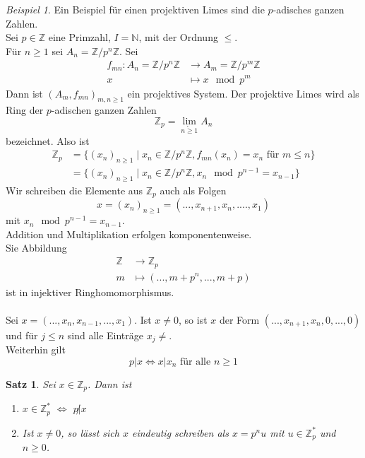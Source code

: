 \documentclass[10pt,a4paper]{article}
\newcommand{\N}{\ensuremath{\mathbb{N}}}
\newcommand{\Z}{\ensuremath{\mathbb{Z}}}
\renewcommand{\projlim}[1]{\lim\limits_{\overleftarrow{#1}}}
\theoremstyle{plain}
\newtheorem{satz}[theorem]{Satz}
\theoremstyle{definition}
\theoremstyle{remark}
\newtheorem{exm}[theorem]{Beispiel}
\begin{document}
	\begin{exm}
		Ein Beispiel für einen projektiven Limes sind die $p$-adisches ganzen Zahlen.\\
		Sei $p\in\Z$ eine Primzahl, $I=\N$, mit der Ordnung $\leq$.\\
		Für $n\geq 1$ sei $A_n=\Z/p^n\Z$. Sei
		\begin{align*}
		f_{mn}:A_n=\Z/p^n\Z&\to A_m=\Z/p^m\Z\\
		x&\mapsto x\mod p^m
		\end{align*}
		Dann ist $(A_m,f_{mn})_{m,n\geq 1}$ ein projektives System. Der projektive Limes wird als Ring der $p$-adischen ganzen Zahlen 
		\[\Z_p=\projlim{n\geq 1}A_n\]
		bezeichnet. Also ist
		\begin{align*}
		\Z_p&=\{(x_n)_{n\geq 1}\mid x_n\in\Z/p^n\Z,f_{mn}(x_n)=x_n\text{ für }m\leq n\}\\
		&=\{(x_n)_{n\geq 1}\mid x_n\in\Z/p^n\Z,x_n\mod p^{n-1}=x_{n-1}\}
		\end{align*}
		Wir schreiben die Elemente aus $\Z_p$ auch als Folgen
		\[x=(x_n)_{n\geq 1}=(...,x_{n+1},x_n,....,x_1)\]
		mit $x_n\mod p^{n-1}=x_{n-1}$.\\
		Addition und Multiplikation erfolgen komponentenweise.\\
		Sie Abbildung
		\begin{align*}
		\Z&\to\Z_p\\
		m&\mapsto(...,m+p^n,...,m+p)
		\end{align*}
		ist in injektiver Ringhomomorphismus.\\
		\\
		
		Sei $x=(...,x_n,x_{n-1},...,x_1)$. Ist $x\neq 0$, so ist $x$ der Form $(...,x_{n+1},x_n,0,...,0)$ und für $j\leq n$ sind alle Einträge $x_j\neq$.\\
		Weiterhin gilt
		\[p|x\Leftrightarrow\text{$x|x_n$ für alle $n\geq 1$}\]
	\end{exm}

	\begin{satz}
		Sei $x\in\Z_p$. Dann ist
		\begin{enumerate}
			\item $x\in\Z_p^*$ $\Leftrightarrow$ $p\not| x$
			\item Ist $x\neq 0$, so lässt sich $x$ eindeutig schreiben als $x=p^nu$ mit $u\in\Z_p^*$ und $n\geq 0$.
		\end{enumerate}
	\end{satz}
\end{document}
